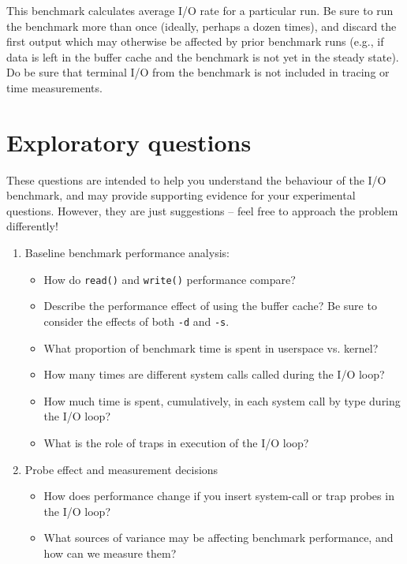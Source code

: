\documentclass[a4paper,10pt]{article}
\begin{document}
This benchmark calculates average I/O rate for a particular run.
Be sure to run the benchmark more than once (ideally, perhaps a dozen times),
and discard the first output which may otherwise be affected by prior
benchmark runs (e.g., if data is left in the buffer cache and the benchmark is
not yet in the steady state).
Do be sure that terminal I/O from the benchmark is not included in tracing or
time measurements.

\section*{Exploratory questions}

These questions are intended to help you understand the behaviour of the I/O
benchmark, and may provide supporting evidence for your experimental
questions.
However, they are just suggestions -- feel free to approach the problem
differently!

\begin{enumerate}
  \item Baseline benchmark performance analysis:
  \begin{itemize}
    \item How do \texttt{read()} and \texttt{write()} performance compare?
    \item Describe the performance effect of using the buffer cache?
      Be sure to consider the effects of both \texttt{-d} and \texttt{-s}.
    \item What proportion of benchmark time is spent in userspace vs. kernel?
    \item How many times are different system calls called during the I/O
      loop?
    \item How much time is spent, cumulatively, in each system call by type
      during the I/O loop?
    \item What is the role of traps in execution of the I/O loop?
  \end{itemize}
  \item Probe effect and measurement decisions
  \begin{itemize}
    \item How does performance change if you insert system-call or trap probes
      in the I/O loop?
    \item What sources of variance may be affecting benchmark performance,
      and how can we measure them?
  \end{itemize}
\end{enumerate}
\end{document}
